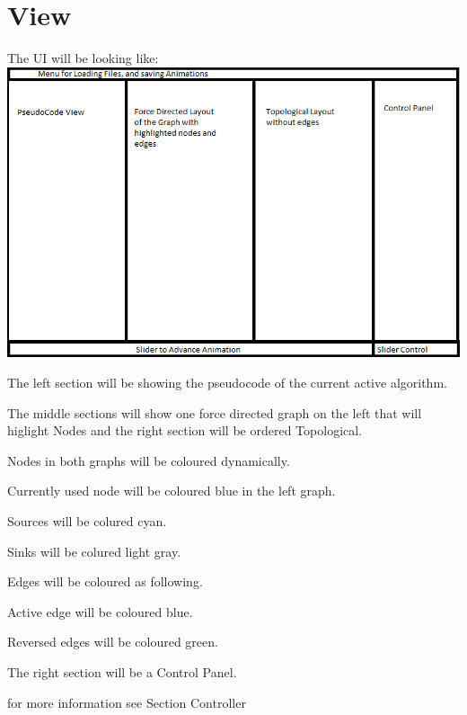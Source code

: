 \section{View}
The UI will be looking like: \\
\includegraphics[width=\textwidth]{parts/UIFinished}
\begin{list}{-}{}
\item The left section will be showing the pseudocode of the current active algorithm.
\item The middle sections will show one force directed  graph on the left that will higlight Nodes and the right section will be ordered Topological.

\item Nodes in both graphs will be coloured dynamically.
\begin{list}{-}{}
\item Currently used node will be coloured blue in the left graph.
\item Sources will be colured cyan.
\item Sinks will be colured light gray.
\end{list}
\item Edges will be coloured as following.
\begin{list}{-}{}
\item Active edge will be coloured blue.
\item Reversed edges will be coloured green.
\end{list}
\item The right section will be a Control Panel.
\begin{list}{-}{}
\item for more information see Section Controller

\end{list}
\end{list}



